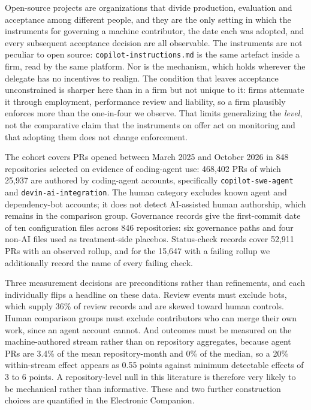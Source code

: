 \documentclass[mnsc]{informs4}
\begin{document}
Open-source projects are organizations that divide production, evaluation and
acceptance among different people, and they are the only setting in which the
instruments for governing a machine contributor, the date each was adopted, and
every subsequent acceptance decision are all observable. The instruments are not
peculiar to open source: \texttt{copilot-instructions.md} is the same artefact
inside a firm, read by the same platform. Nor is the mechanism, which holds
wherever the delegate has no incentives to realign. The condition that leaves acceptance unconstrained is sharper here than in a
firm but not unique to it:
firms attenuate it through employment, performance review and liability, so a firm
plausibly enforces more than the one-in-four we observe. That limits generalizing
the \emph{level}, not the comparative claim that the instruments on offer act on
monitoring and that adopting them does not change enforcement.

The cohort covers PRs opened between March 2025 and October 2026 in 848
repositories selected on evidence of coding-agent use: 468,402 PRs of which 25,937
are authored by coding-agent accounts, specifically \texttt{copilot-swe-agent} and
\texttt{devin-ai-integration}. The human category excludes known agent and
dependency-bot accounts; it does not detect AI-assisted human authorship, which
remains in the comparison group. Governance records give the first-commit date of
ten configuration files across 846 repositories: six governance paths and four
non-AI files used as treatment-side placebos. Status-check records cover 52,911 PRs
with an observed rollup, and for the 15,647 with a failing rollup we additionally
record the name of every failing check.

Three measurement decisions are preconditions rather than refinements, and each
individually flips a headline on these data. Review events must exclude bots, which
supply 36\% of review records and are skewed toward human controls. Human
comparison groups must exclude contributors who can merge their own work, since an
agent account cannot. And outcomes must be measured on the machine-authored stream
rather than on repository aggregates, because agent PRs are 3.4\% of the mean
repository-month and 0\% of the median, so a 20\% within-stream effect appears as
0.55 points against minimum detectable effects of 3 to 6 points. A repository-level
null in this literature is therefore very likely to be mechanical rather than
informative. These and two
further construction choices are quantified in the Electronic Companion.
\end{document}
